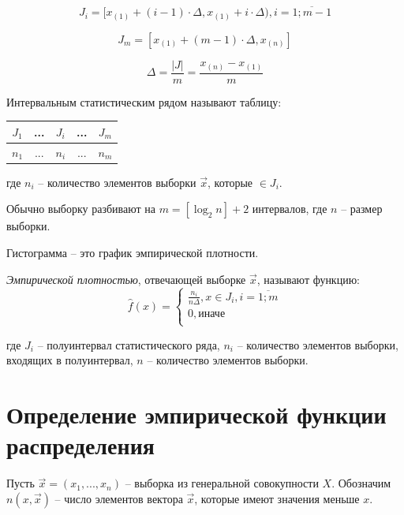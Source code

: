 \documentclass[12pt]{report}
\begin{document}
\begin{equation*}
	J_i = [x_{(1)} + (i - 1) \cdot \Delta, x_{(1)} + i \cdot \Delta), i = \overline{1; m - 1}
\end{equation*}

\begin{equation*}
	J_{m} = [x_{(1)} + (m - 1) \cdot \Delta, x_{(n)}]
\end{equation*}

\begin{equation*}
	\Delta = \frac{|J|}{m} = \frac{x_{(n)} - x_{(1)}}{m}
\end{equation*}

Интервальным статистическим рядом называют таблицу:

\begin{table}[htb]
	\centering
	\begin{tabular}{|c|c|c|c|c|}
		\hline
		$J_1$ & ... & $J_i$ & ... & $J_m$ \\
		\hline
		$n_1$ & ... & $n_i$ & ... & $n_m$ \\
		\hline
	\end{tabular}
\end{table}

где $n_i$ -- количество элементов выборки $\vec x$, которые $\in J_i$.

Обычно выборку разбивают на $m=[\log_2n]+2$ интервалов, где $n$ -- размер выборки.

Гистограмма -- это график эмпирической плотности. 

\textit{Эмпирической плотностью}, отвечающей выборке $\vec x$, называют функцию:
\begin{equation}
	\hat f(x) =
	\begin{cases}
		\frac{n_i}{n \Delta}, x \in J_i, i = \overline{1; m} \\
		0, \text{иначе} \\
	\end{cases}
\end{equation}

где $J_i$ -- полуинтервал статистического ряда, $n_i$ -- количество элементов выборки, входящих в полуинтервал, $n$ -- количество элементов выборки.


\section*{Определение эмпирической функции распределения}

Пусть $\vec x = (x_1, ..., x_n)$ -- выборка из генеральной совокупности $X$. Обозначим $n(x, \vec x)$ -- число элементов вектора $\vec x$, которые имеют значения меньше $x$.
\end{document}
